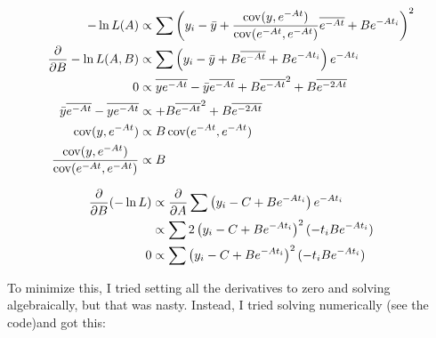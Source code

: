 \begin{align*}
    -\ln L(A) &\propto \sum \left(y_i - \bar{y} + \frac{\operatorname{cov}(y, e^{-At})}{\operatorname{cov}(e^{-At}, e^{-At})} \overline{e^{-At}} + B e^{-At_i}\right)^2 \\
    \frac{\partial}{\partial B}-\ln L(A,B) &\propto \sum \left(y_i - \bar{y} + B \overline{e^{-At}} + B e^{-At_i}\right)e^{-At_i} \\
    0 &\propto \overline{y e^{-At}} - \bar{y}\overline{e^{-At}} + B \overline{e^{-At}}^2 + B \overline{e^{-2At}} \\
    \bar{y}\overline{e^{-At}} - \overline{y e^{-At}} &\propto  + B \overline{e^{-At}}^2 + B \overline{e^{-2At}} \\
    \operatorname{cov}(y, e^{-At}) &\propto B \operatorname{cov}(e^{-At}, e^{-At}) \\
    \frac{\operatorname{cov}(y, e^{-At})}{\operatorname{cov}(e^{-At}, e^{-At})} &\propto B  \\
\end{align*}



\begin{align*}
    \frac{\partial}{\partial B}(-\ln L) &\propto \frac{\partial}{\partial A}\sum \left(y_i - C + B e^{-At_i}\right)e^{-At_i} \\
    &\propto \sum 2\left(y_i - C + B e^{-At_i}\right)^2(-t_iB e^{-At_i}) \\
    0 &\propto \sum \left(y_i - C + B e^{-At_i}\right)^2(-t_iB e^{-At_i}) \\
\end{align*}

To minimize this, I tried setting all the derivatives to zero and solving algebraically, but that was nasty. Instead, I tried solving numerically (see the code)and got this:




